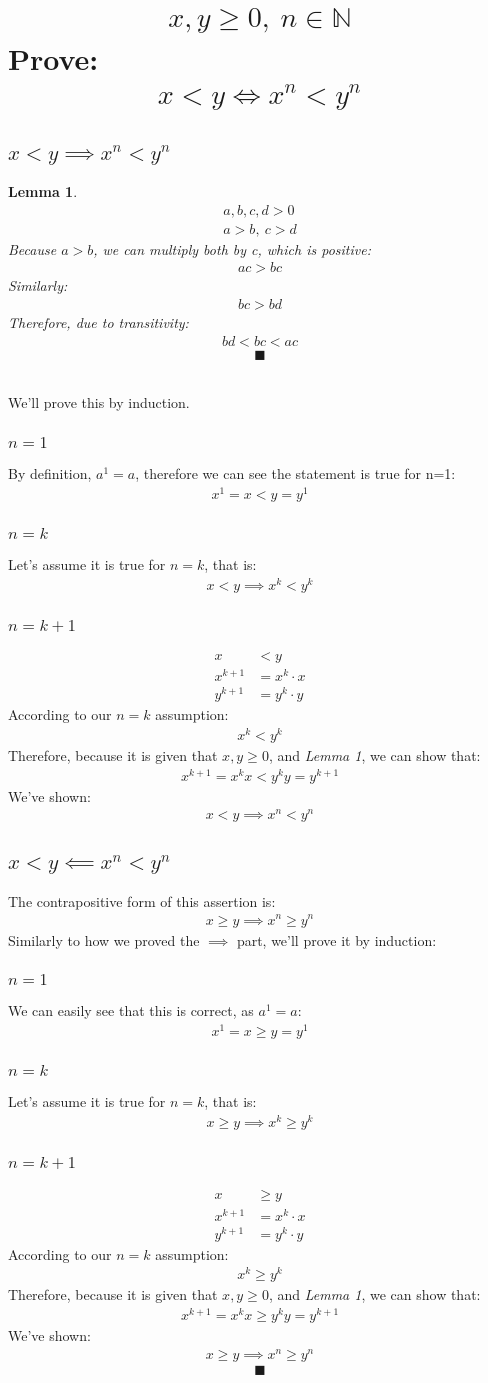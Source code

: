 \documentclass[a4paper, 12pt]{article}
\newcommand{\sub}[1]{\subsection{\underline{#1}}}
\newcommand{\subsub}[1]{\subsubsection{\underline{#1}}}
\newcommand{\?}{\stackrel{?}{=}}
\newcommand{\N}{\ensuremath{\mathbb{N}}}
\newcommand{\eq}[1]{\begin{align*}#1\end{align*}}
\renewcommand{\qed}{$$\blacksquare$$}
\newtheorem{lemma}{Lemma}
\begin{document}
\section{\eq{ x,y\geq{0},~n\in{\N}} Prove: \eq{x<y \iff x^n<y^n }}
\sub{$x<y \implies x^n<y^n$}
\begin{lemma}
    \eq{
        a,b,c,d > 0\\
        a>b,~c>d
    }
    Because $a>b$, we can multiply both by c, which is positive:
    \eq{ac>bc}
    Similarly: \eq{bc>bd}
    Therefore, due to transitivity: \eq{bd<bc<ac}
    \qed
\end{lemma}
~\\We'll prove this by induction.
\subsub{$n=1$}
By definition, $a^1=a$, therefore we can see the statement is true for n=1:
\eq{ x^1=x<y=y^1 }
\subsub{$n=k$}
Let's assume it is true for $n=k$, that is:
\eq{x<y \implies x^k<y^k}
\subsub{$n=k+1$}
\eq{
    x&<y\\
    x^{k+1}&=x^k\cdot{x}\\
    y^{k+1}&=y^k\cdot{y}
}
According to our $n=k$ assumption:
\eq{x^k<y^k}
Therefore, because it is given that $x,y\geq{0}$, and \textit{Lemma 1}, we can show that:
\eq{x^{k+1}=x^{k}x<y^{k}y=y^{k+1}}
We've shown: \eq{x<y \implies x^n<y^n}
\sub{$x<y \impliedby x^n<y^n$}
The contrapositive form of this assertion is:
\eq{x\geq{y}\implies{x^n\geq{y^n}}}
Similarly to how we proved the $\implies$ part, we'll prove it by induction:
\subsub{$n=1$}
We can easily see that this is correct, as $a^1=a$: \eq{x^1=x\geq{y}=y^1}
\subsub{$n=k$}
Let's assume it is true for $n=k$, that is:
\eq{x\geq{y} \implies x^k\geq y^k}
\subsub{$n=k+1$}
\eq{
    x&\geq y\\
    x^{k+1}&=x^k\cdot{x}\\
    y^{k+1}&=y^k\cdot{y}
}
According to our $n=k$ assumption:
\eq{x^k\geq{y^k}}
Therefore, because it is given that $x,y\geq{0}$, and \textit{Lemma 1}, we can show that:
\eq{x^{k+1}=x^{k}x\geq y^{k}y=y^{k+1}}
We've shown: \eq{x\geq{y} \implies x^n\geq{y^n}}
\qed

\end{document}
